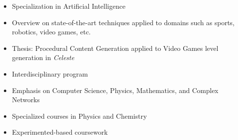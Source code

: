 \documentclass[10pt,a4paper]{altacv}
\begin{document}


\begin{fullwidth}
\makecvheader
\end{fullwidth}


\begin{itemize}
\item Specialization in Artificial Intelligence
\item Overview on state-of-the-art techniques applied to domains such as sports, robotics, video games, etc.
\item Thesis: Procedural Content Generation applied to Video Games level generation in \textit{Celeste}

\end{itemize}

\divider

\begin{itemize}
\item Interdisciplinary program
\item Emphasis on Computer Science, Physics, Mathematics, and Complex Networks

\end{itemize}

\divider


\begin{itemize}
\item Specialized courses in Physics and Chemistry
\item Experimented-based coursework
\end{itemize}
\divider
\end{document}
